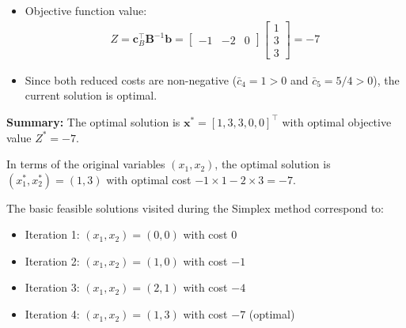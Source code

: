 \documentclass[11pt]{article}
\newcommand{\mb}[1]{\ensuremath{\boldsymbol{#1}}}
\begin{document}
\begin{enumerate}
\begin{itemize}
\item Objective function value:
\begin{align*}
Z = \mb{c}_B^\top\mb{B}^{-1}\mb{b} = \begin{bmatrix} -1 & -2 & 0 \end{bmatrix} \begin{bmatrix} 1 \\ 3 \\ 3 \end{bmatrix} = -7
\end{align*}

\item Since both reduced costs are non-negative ($\bar{c}_4 = 1 > 0$ and $\bar{c}_5 = 5/4 > 0$), the current solution is optimal.

\end{itemize}

\textbf{Summary:}
The optimal solution is $\mb{x}^* = [1, 3, 3, 0, 0]^\top$ with optimal objective value $Z^* = -7$.

In terms of the original variables $(x_1, x_2)$, the optimal solution is $(x_1^*, x_2^*) = (1, 3)$ with optimal cost $-1 \times 1 - 2 \times 3 = -7$.

The basic feasible solutions visited during the Simplex method correspond to:
\begin{itemize}
\item Iteration 1: $(x_1, x_2) = (0, 0)$ with cost $0$
\item Iteration 2: $(x_1, x_2) = (1, 0)$ with cost $-1$ 
\item Iteration 3: $(x_1, x_2) = (2, 1)$ with cost $-4$
\item Iteration 4: $(x_1, x_2) = (1, 3)$ with cost $-7$ (optimal)
\end{itemize}
\end{enumerate}
\end{document}

